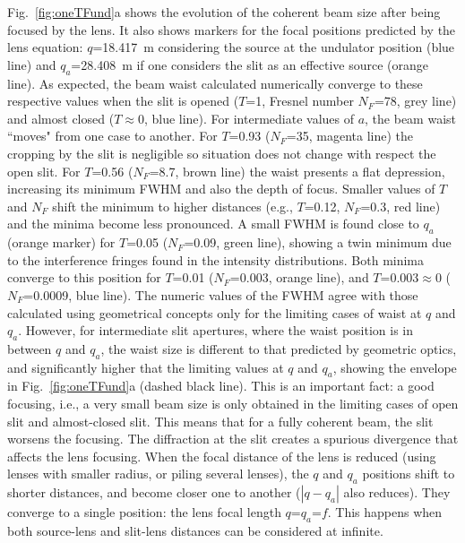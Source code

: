 \documentclass[9pt,twocolumn,twoside]{osajnl}
\begin{document}
Fig.~\ref{fig:oneTFund}a shows the evolution of the coherent beam size after being focused by the lens. It also shows markers for the focal positions predicted by the lens equation:  $q$=\SI{18.417}{\meter} considering the source at the undulator position (blue line) and $q_a$=\SI{28.408}{\meter} if one considers the slit as an effective source (orange line). As expected, the beam waist calculated numerically converge to these respective values when the slit is opened ($T$=1, Fresnel number $N_F$=78, grey line) and almost closed ($T\approx 0$, blue line). For intermediate values of $a$, the beam waist ``moves" from one case to another. For $T$=0.93 ($N_F$=35, magenta line) the cropping by the slit is negligible so situation does not change with respect the open slit. For $T$=0.56 ($N_F$=8.7, brown line) the waist presents a flat depression, increasing its minimum FWHM and also the depth of focus. Smaller values of $T$ and $N_F$ shift the minimum to higher distances (e.g., $T$=0.12, $N_F$=0.3,  red line) and the minima become less pronounced. A small FWHM is found close to $q_a$ (orange marker) for $T$=0.05 ($N_F$=0.09, green line), showing a twin minimum due to the interference fringes found in the intensity distributions. Both minima converge to this position for $T$=0.01 ($N_F$=0.003, orange line), and $T$=0.003$\approx 0$ ($N_F$=0.0009, blue line). 
The numeric values of the FWHM agree with those calculated using geometrical concepts only for the limiting cases of waist at $q$ and $q_a$. 
However, for intermediate slit apertures, where the waist position is in between $q$ and $q_a$, the waist size is different to that predicted by geometric optics, and significantly higher that the limiting values at $q$ and $q_a$, showing the envelope in Fig.~\ref{fig:oneTFund}a (dashed black line).
This is an important fact: a good focusing, i.e., a very small beam size is only obtained in the limiting cases of open slit and almost-closed slit. This means that for a fully coherent beam, the slit worsens the focusing. The diffraction at the slit creates a spurious divergence that affects the lens focusing. 
When the focal distance of the lens is reduced (using lenses with smaller radius, or piling several lenses), the $q$ and $q_a$ positions shift to shorter distances, and become closer one to another ($|q-q_a|$ also reduces). They converge to a single position: the lens focal length $q$=$q_a$=$f$. This happens when both source-lens and slit-lens distances can be considered at infinite. 
\end{document}
